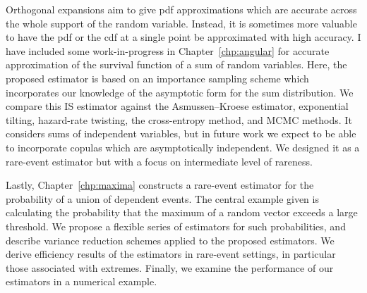 


Orthogonal expansions aim to give pdf approximations which are accurate across the whole support of the random variable. Instead, it is sometimes more valuable to have the pdf or the cdf at a single point be approximated with high accuracy. I have included some work-in-progress in Chapter~\ref{chp:angular} for accurate approximation of the survival function of a sum of random variables. Here, the proposed estimator is based on an importance sampling scheme which incorporates our knowledge of the asymptotic form for the sum distribution. We compare this IS estimator against the Asmussen--Kroese estimator, exponential tilting, hazard-rate twisting, the cross-entropy method, and MCMC methods. It considers sums of independent variables, but in future work we expect to be able to incorporate copulas which are asymptotically independent. We designed it as a rare-event estimator but with a focus on intermediate level of rareness.

Lastly, Chapter~\ref{chp:maxima} constructs a rare-event estimator for the probability of a union of dependent events. The central example given is calculating the probability that the maximum of a random vector exceeds a large threshold. We propose a flexible series of estimators for such probabilities, and describe variance reduction schemes applied to the proposed estimators. We derive efficiency results of the estimators in rare-event settings, in particular those associated with extremes. Finally, we examine the performance of our estimators in a numerical example.
